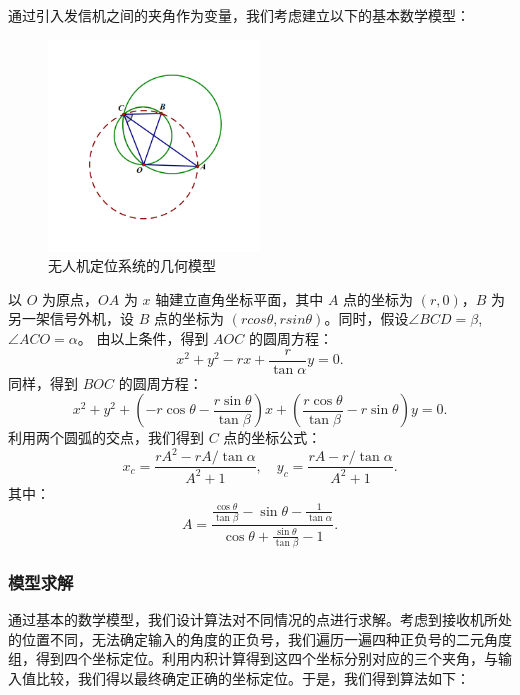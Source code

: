 \documentclass{my_paper}
\begin{document}
通过引入发信机之间的夹角作为变量，我们考虑建立以下的基本数学模型：

\begin{figure}[H]
    \centering
    \includegraphics[width=0.5\textwidth]{sketch2}
    \caption{无人机定位系统的几何模型} 
\end{figure}

以 $O$ 为原点，$OA$ 为 $x$ 轴建立直角坐标平面，其中 $A$ 点的坐标为 $(r,0)$，$B$ 为另一架信号外机，设 $B$ 点的坐标为 $(rcos\theta,rsin\theta)$。同时，假设$\angle B C D = \beta$, $ \angle A C O = \alpha$。
由以上条件，得到 $AOC$ 的圆周方程：
$$
x ^ { 2 } + y ^ { 2 } - r x + \frac { r } { \tan \alpha } y = 0.
$$
同样，得到 $BOC$ 的圆周方程：
$$
x ^ { 2 } + y ^ { 2 } + ( - r \cos \theta - \frac { r \sin \theta } { \tan \beta } ) x + ( \frac { r \cos \theta } { \tan \beta } - r \sin \theta ) y = 0.
$$
利用两个圆弧的交点，我们得到 $C$ 点的坐标公式：
$$
x _ { c } = \frac { r A ^ { 2 } - r A / \tan \alpha } { A ^ { 2 } + 1 }, 
\quad y _ { c } = \frac { r A - r / \tan \alpha } { A ^ { 2 } + 1 }.
$$
其中：
$$
A = \frac { \frac { \cos \theta } { \tan \beta } - \sin \theta - \frac { 1 } { \tan \alpha } } { \cos \theta + \frac { \sin \theta } { \tan \beta } - 1 }.
$$

\subsubsection{模型求解}

通过基本的数学模型，我们设计算法对不同情况的点进行求解。考虑到接收机所处的位置不同，无法确定输入的角度的正负号，我们遍历一遍四种正负号的二元角度组，得到四个坐标定位。利用内积计算得到这四个坐标分别对应的三个夹角，与输入值比较，我们得以最终确定正确的坐标定位。于是，我们得到算法如下：
\end{document}
